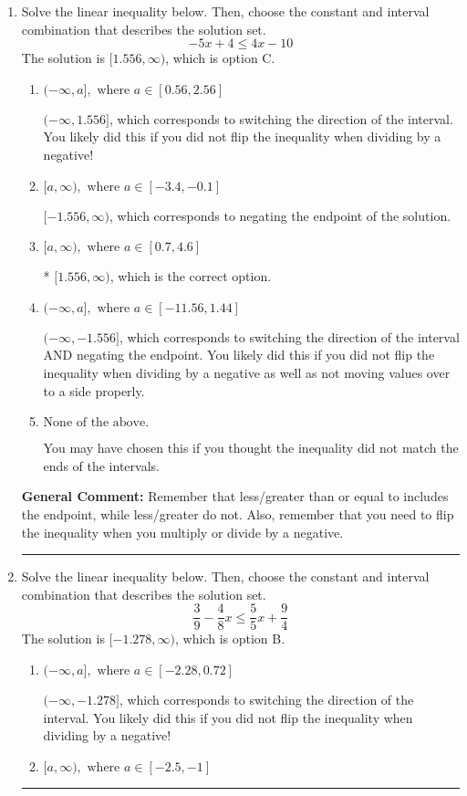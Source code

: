 \documentclass{extbook}[14pt]
\newcommand{\litem}[1]{\item #1

\rule{\textwidth}{0.4pt}}
\begin{document}
\begin{enumerate}\litem{
Solve the linear inequality below. Then, choose the constant and interval combination that describes the solution set.
\[ -5x + 4 \leq 4x -10 \]
The solution is \( [1.556, \infty) \), which is option C.\begin{enumerate}[label=\Alph*.]
\item \( (-\infty, a], \text{ where } a \in [0.56, 2.56] \)

 $(-\infty, 1.556]$, which corresponds to switching the direction of the interval. You likely did this if you did not flip the inequality when dividing by a negative!
\item \( [a, \infty), \text{ where } a \in [-3.4, -0.1] \)

 $[-1.556, \infty)$, which corresponds to negating the endpoint of the solution.
\item \( [a, \infty), \text{ where } a \in [0.7, 4.6] \)

* $[1.556, \infty)$, which is the correct option.
\item \( (-\infty, a], \text{ where } a \in [-11.56, 1.44] \)

 $(-\infty, -1.556]$, which corresponds to switching the direction of the interval AND negating the endpoint. You likely did this if you did not flip the inequality when dividing by a negative as well as not moving values over to a side properly.
\item \( \text{None of the above}. \)

You may have chosen this if you thought the inequality did not match the ends of the intervals.
\end{enumerate}

\textbf{General Comment:} Remember that less/greater than or equal to includes the endpoint, while less/greater do not. Also, remember that you need to flip the inequality when you multiply or divide by a negative.
}
\litem{
Solve the linear inequality below. Then, choose the constant and interval combination that describes the solution set.
\[ \frac{3}{9} - \frac{4}{8} x \leq \frac{5}{5} x + \frac{9}{4} \]
The solution is \( [-1.278, \infty) \), which is option B.\begin{enumerate}[label=\Alph*.]
\item \( (-\infty, a], \text{ where } a \in [-2.28, 0.72] \)

 $(-\infty, -1.278]$, which corresponds to switching the direction of the interval. You likely did this if you did not flip the inequality when dividing by a negative!
\item \( [a, \infty), \text{ where } a \in [-2.5, -1] \)


\end{enumerate}}
\end{enumerate}
\end{document}
